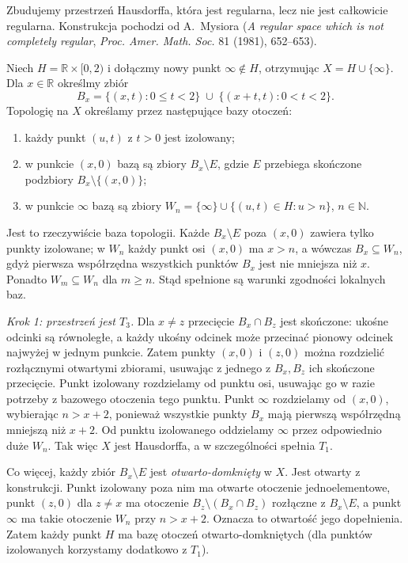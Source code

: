 \begin{przyklad}
\label{ex:topog-mysior-t3-nie-tych}
Zbudujemy przestrzeń Hausdorffa, która jest regularna,
lecz nie jest całkowicie regularna. Konstrukcja pochodzi od
A.~Mysiora (\emph{A regular space which is not completely regular},
\emph{Proc. Amer. Math. Soc.} 81 (1981), 652--653).

Niech $H=\mathbb R\times[0,2)$ i dołączmy nowy punkt
$\infty\notin H$, otrzymując $X=H\cup\{\infty\}$.
Dla $x\in\mathbb R$ określmy zbiór
\[
B_x=\{(x,t):0\le t<2\}\;\cup\;
\{(x+t,t):0<t<2\}.
\]
Topologię na $X$ określamy przez następujące bazy otoczeń:
\begin{enumerate}[label=(\roman*)]
\item każdy punkt $(u,t)$ z $t>0$ jest izolowany;
\item w punkcie $(x,0)$ bazą są zbiory $B_x\setminus E$,
      gdzie $E$ przebiega skończone podzbiory
      $B_x\setminus\{(x,0)\}$;
\item w punkcie $\infty$ bazą są zbiory
      $W_n=\{\infty\}\cup\{(u,t)\in H:u>n\}$, $n\in\mathbb N$.
\end{enumerate}
Jest to rzeczywiście baza topologii. Każde $B_x\setminus E$
poza $(x,0)$ zawiera tylko punkty izolowane; w $W_n$
każdy punkt osi $(x,0)$ ma $x>n$, a wówczas
$B_x\subseteq W_n$, gdyż pierwsza współrzędna
wszystkich punktów $B_x$ jest nie mniejsza niż $x$.
Ponadto $W_m\subseteq W_n$ dla $m\ge n$.
Stąd spełnione są warunki zgodności lokalnych baz.

\emph{Krok 1: przestrzeń jest $T_3$.}
Dla $x\ne z$ przecięcie $B_x\cap B_z$ jest skończone:
ukośne odcinki są równoległe, a każdy ukośny odcinek
może przecinać pionowy odcinek najwyżej w jednym punkcie.
Zatem punkty $(x,0)$ i $(z,0)$ można rozdzielić
rozłącznymi otwartymi zbiorami, usuwając z jednego
z $B_x,B_z$ ich skończone przecięcie.
Punkt izolowany rozdzielamy od punktu osi, usuwając go
w razie potrzeby z bazowego otoczenia tego punktu.
Punkt $\infty$ rozdzielamy od $(x,0)$, wybierając
$n>x+2$, ponieważ wszystkie punkty $B_x$ mają
pierwszą współrzędną mniejszą niż $x+2$.
Od punktu izolowanego oddzielamy $\infty$ przez
odpowiednio duże $W_n$. Tak więc $X$ jest Hausdorffa,
a w szczególności spełnia $T_1$.

Co więcej, każdy zbiór $B_x\setminus E$ jest
\emph{otwarto-domknięty} w $X$.
Jest otwarty z konstrukcji. Punkt izolowany poza nim
ma otwarte otoczenie jednoelementowe, punkt $(z,0)$
dla $z\ne x$ ma otoczenie
$B_z\setminus(B_x\cap B_z)$ rozłączne z $B_x\setminus E$,
a punkt $\infty$ ma takie otoczenie $W_n$ przy $n>x+2$.
Oznacza to otwartość jego dopełnienia.
Zatem każdy punkt $H$ ma bazę otoczeń
otwarto-domkniętych (dla punktów izolowanych
korzystamy dodatkowo z $T_1$).


\end{przyklad}

